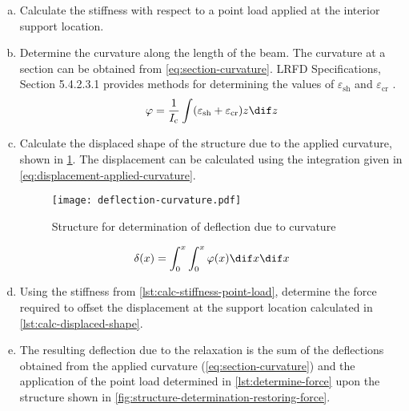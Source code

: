 \begin{enumerate}[a)]
  \item\label{lst:calc-stiffness-point-load} Calculate the stiffness with respect to a point load applied at the interior support location.
  \item Determine the curvature along the length of the beam. The curvature at a section can be obtained from \cref{eq:section-curvature}. LRFD Specifications, Section 5.4.2.3.1 provides methods for determining the values of $\varepsilon_\text{sh}$ and $\varepsilon_\text{cr}$ .
  \begin{equation}
    \label{eq:section-curvature}
    \varphi =\frac{1}{I_\text{c}} \int (\varepsilon_\text{sh}+ \varepsilon_\text{cr}) z \dif z
  \end{equation}
  \item\label{lst:calc-displaced-shape} Calculate the displaced shape of the structure due to the applied curvature, shown in \cref{fig:deflection-curvature}. The displacement can be calculated using the integration given in \cref{eq:displacement-applied-curvature}.
  \begin{figure}
    \texttt{[image: deflection-curvature.pdf]}
    \caption{Structure for determination of deflection due to curvature}
    \label{fig:deflection-curvature}
  \end{figure}
  \begin{equation}
    \label{eq:displacement-applied-curvature}
    \delta(x) = \int_0^x\int_0^x \varphi(x) \dif x\dif x
  \end{equation}
  \item\label{lst:determine-force} Using the stiffness from \ref{lst:calc-stiffness-point-load}, determine the force required to offset the displacement at the support location calculated in \ref{lst:calc-displaced-shape}.
  \item The resulting deflection due to the relaxation is the sum of the deflections obtained from the applied curvature (\cref{eq:section-curvature}) and the application of the point load determined in \ref{lst:determine-force} upon the structure
  shown in \cref{fig:structure-determination-restoring-force}.
\end{enumerate}

